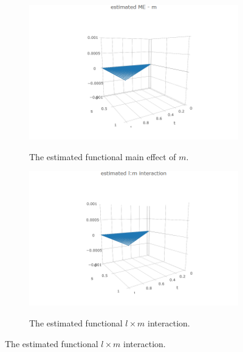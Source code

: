 \documentclass[12pt]{article}
\theoremstyle{definition}
\begin{document}
\begin{figure}[H]
\begin{subfigure}[t]{0.45\textwidth}
\centering
\includegraphics[width = \textwidth]{img/cattle/estimated-cholesky-surface-m-me-3d}
\label{fig:cattleA-m-me}
\caption{The estimated functional main effect of $m$.}
\end{subfigure}
\hfill
 \begin{subfigure}[t]{0.45\textwidth}
\centering
\includegraphics[width = \textwidth]{img/cattle/estimated-cholesky-surface-lm-interaction-3d}
\label{fig:cattleA-lm-interaction}
\caption{The estimated functional $l \times m$ interaction.}
\end{subfigure} 
\end{figure}
\end{document}
